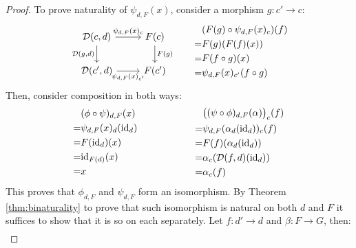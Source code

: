 \begin{theorem}
\begin{proof}
    To prove naturality of $\psi_{d, F}(x)$, consider a morphism $g:c'\to c$:
    \[\begin{tikzcd}[ampersand replacement=\&]
      {\D(c,d)} \& {F(c)} \\
      {\D(c',d)} \& {F(c')}
      \arrow["{\psi_{d, F}(x)_c}", from=1-1, to=1-2]
      \arrow["{\psi_{d,F}(x)_{c'}}"', from=2-1, to=2-2]
      \arrow["{\D(g,d)}"', from=1-1, to=2-1]
      \arrow["{F(g)}", from=1-2, to=2-2]
    \end{tikzcd}\qquad\begin{aligned}
        &(F(g)\circ \psi_{d, F}(x)_c)(f)\\
        =& F(g)(F(f)(x))\\
        =& F(f\circ g)(x)\\
        =& \psi_{d, F}(x)_{c'}(f\circ g)
      \end{aligned}
    \]
    Then, consider composition in both ways:
    \[
      \begin{aligned}
        &(\phi \circ \psi)_{d, F}(x)\\
        =& \psi_{d, F}(x)_{d}(\mathrm{id}_d)\\
        =& F(\mathrm{id}_d)(x)\\
        =& \mathrm{id}_{F(d)}(x)\\
        =& x
      \end{aligned}
      \qquad\qquad\qquad
      \begin{aligned}
        &\big((\psi \circ \phi)_{d, F}(\alpha)\big)_c(f)\\
        =& \psi_{d, F} (\alpha_d(\mathrm{id}_d))_c(f)\\
        =& F(f)(\alpha_d(\mathrm{id}_d))\\
        =& \alpha_c(\mathcal{D}(f, d)(\mathrm{id}_d))\\
        =& \alpha_c(f)
      \end{aligned}
    \]
    This proves that $\phi_{d, F}$ and $\psi_{d, F}$ form an isomorphism. By
    Theorem \ref{thm:binaturality} to prove that such isomorphism is natural on
    both $d$ and $F$ it suffices to show that it is so on each separately. Let
    $f: d' \to d$ and $\beta: F \to G$, then:
    \[
      \begin{gathered}

\end{gathered}\]
\end{proof}
\end{theorem}
